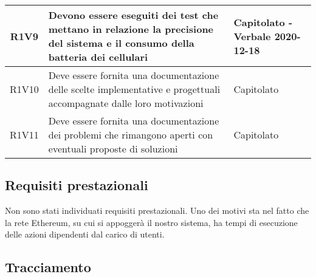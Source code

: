 \begin{center}
\begin{longtable}{|c|p{10cm}|p{4cm}|}
R1V9&Devono essere eseguiti dei test che mettano in relazione la precisione del sistema e il consumo della batteria dei cellulari	& Capitolato - Verbale 2020-12-18	\\
		\hline
R1V10&Deve essere fornita una documentazione delle scelte implementative e progettuali accompagnate dalle loro motivazioni	& Capitolato	\\
		\hline
	R1V11	&Deve essere fornita una documentazione dei problemi che rimangono aperti con eventuali proposte di soluzioni	& Capitolato	\\
		\hline
	\end{longtable}
\end{center}

\subsection{Requisiti prestazionali}
Non sono stati individuati requisiti prestazionali. Uno dei motivi sta nel fatto che la rete Ethereum, su cui si appoggerà il nostro sistema, ha tempi di esecuzione delle azioni dipendenti dal carico di utenti.
%		
%		

\subsection{Tracciamento}
